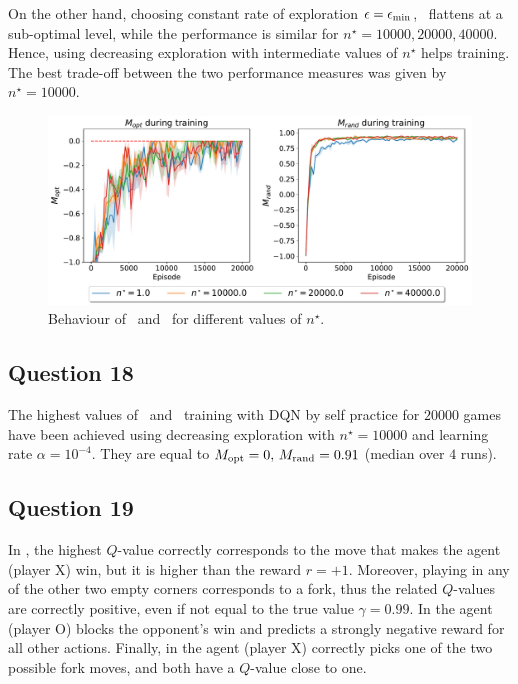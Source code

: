 \documentclass[10pt]{IEEEtran}
\begin{document}
On the other hand, choosing constant rate of exploration $\epsilon = \epsilon_{\text{min}}$, \mrand \ flattens at a sub-optimal level, while the performance is similar for $n^{\star} = 10000, 20000, 40000$. Hence, using decreasing exploration with intermediate values of $n^{\star}$ helps training.
The best trade-off between the two performance measures was given by $n^{\star} = 10000$.    
\begin{figure}[h]
    \centering
    \includegraphics[width = \linewidth]{code/figures/performance_n_star_dqn_self.pdf}
    \caption{Behaviour of \mopt\ and \mrand\ for different values of $n^{\star}$.}
    \label{plot_question17}
\end{figure}

\subsection*{Question 18}
The highest values of \mopt\  and \mrand\  training with DQN by self practice for $20000$ games have been achieved using decreasing exploration with $n^{\star} = 10000$ and learning rate $\alpha = 10^{-4}$. They are equal to $M_{\text{opt}} = 0, \, M_{\text{rand}} = 0.91$ (median over $4$ runs).

\subsection*{Question 19}
In , the highest $Q$-value correctly corresponds to the move that makes the agent (player X) win, but it is higher than the reward $r = +1$. Moreover, playing in any of the other two empty corners corresponds to a fork, thus the related $Q$-values are correctly positive, even if not equal to the true value $\gamma = 0.99$. In  the agent (player O) blocks the opponent's win and predicts a strongly negative reward for all other actions. Finally, in  the agent (player X) correctly picks one of the two possible fork moves, and both have a $Q$-value close to one.
\end{document}
